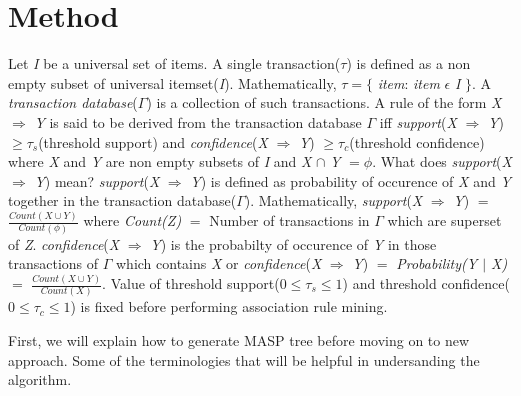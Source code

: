 \documentclass[review]{elsarticle}
\begin{document}
\section{Method}
Let \emph{I} be a universal set of items. A single transaction($\tau$) is defined as a non empty subset of universal itemset(\emph{I}). Mathematically, $ \tau = \lbrace $ \textit{item}: \textit{item} $ \epsilon $ \emph{I} $\rbrace$. A \textit{transaction database}($ \Gamma $) is a collection of such transactions. A rule of the form \emph{X} $ \Rightarrow $ \emph{Y} is said to be derived from the transaction database $ \Gamma $ iff \emph{support}(\emph{X} $ \Rightarrow $ \emph{Y}) $ \geq \tau _{s} $(threshold support) and \emph{confidence}(\emph{X} $ \Rightarrow $ \emph{Y}) $ \geq \tau _{c} $(threshold confidence) where \emph{X} and \emph{Y} are non empty subsets of \emph{I} and \emph{X} $ \cap $ \emph{Y} $ =\phi $. What does \emph{support}(\emph{X} $ \Rightarrow $ \emph{Y}) mean? \emph{support}(\emph{X} $ \Rightarrow $ \emph{Y})  is defined as probability of occurence of \emph{X} and \emph{Y} together in the transaction database($ \Gamma $). Mathematically, \emph{support}(\emph{X} $ \Rightarrow $ \emph{Y}) $ = $ $ \frac{Count(X \cup Y)}{Count(\phi)} $ where \emph{Count(Z)} $ = $ Number of transactions in $ \Gamma $ which are superset of \emph{Z}. \emph{confidence}(\emph{X} $ \Rightarrow $ \emph{Y}) is the probabilty of occurence of \emph{Y} in those transactions of $ \Gamma $ which contains \emph{X} or \emph{confidence}(\emph{X} $ \Rightarrow $ \emph{Y}) $ = $ \emph{Probability(Y $ \vert $ X)} $ = $ $ \frac{Count(X \cup Y)}{Count(X)} $. Value of threshold support($ 0 \leq \tau _{s} \leq 1 $) and threshold confidence($ 0 \leq \tau _{c} \leq 1 $) is fixed before performing association rule mining.

First, we will explain how to generate MASP tree before moving on to new approach. Some of the terminologies that will be helpful in undersanding the algorithm.
\end{document}
